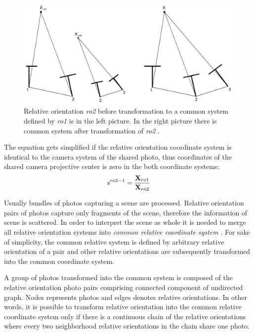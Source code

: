 \documentclass[a4paper,12pt]{article}
\newcommand{\evect}[1]{
{\bf #1}
}
\newcommand{\escal}[1]{
{\it #1}
}
\newcommand{\term}[1]{
{\it #1}%
}
\begin{document}
\begin{figure}[h]
    \centering
    \includegraphics[scale=0.25]{figures/rel_or.png}
    \caption{Relative orientation \term{ro2} before transformation 
    to a common system defined by \term{ro1} is in the left picture. 
    In the right picture there is common system after transformation of  \term{ro2}.}
    \label{fig:rel_or_amb}
\end{figure}


The equation gets simplified if the relative orientation coordinate system is identical  to the camera system of the shared photo, thus 
coordinates of the shared camera projective center is zero in the both coordinate systems: 
\begin{equation}
\escal{s}^{ro2-1} = \frac{\evect{X}_{ro1}}
	                 {\evect{X}_{ro2}}
\end{equation}

Usually bundles of photos capturing a scene are processed. Relative orientation pairs of photos capture only fragments of the scene, 
therefore the information of scene is scattered.  
In order to interpret the scene as whole it is needed to merge all relative orientation systems into \term{common relative coordinate system}.
For sake of simplicity, the common relative system is defined by arbitrary relative orientation of a pair and other 
relative orientations are subsequently transformed into the common coordinate system. 


A group of photos transformed into the common system is composed of the relative orientation photo pairs
 comprising connected component of undirected graph.  Nodes represents  photos and edges denotes relative orientations. 
In other words, it is possible to transform relative orientation into the common relative coordinate system only if there 
is a continuous chain of the relative orientations where every two neighborhood relative orientations in the chain share one photo.
\end{document}
